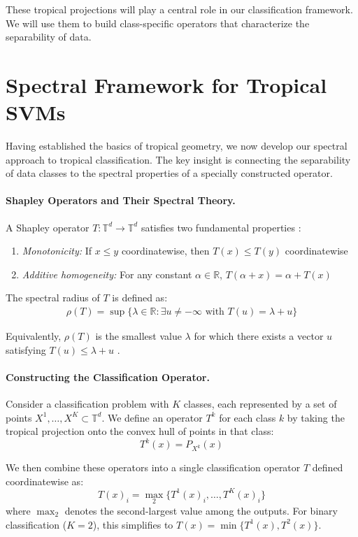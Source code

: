 \documentclass{article}
\newcommand{\R}{\mathbb{R}}
\newcommand{\trop}{\mathbb{T}}
\begin{document}
These tropical projections will play a central role in our classification framework. We will use them to build class-specific operators that characterize the separability of data.

\section{Spectral Framework for Tropical SVMs}\label{sec:spectral}

Having established the basics of tropical geometry, we now develop our spectral approach to tropical classification. The key insight is connecting the separability of data classes to the spectral properties of a specially constructed operator.

\paragraph{Shapley Operators and Their Spectral Theory.}
A Shapley operator $T: \trop^d \to \trop^d$ satisfies two fundamental properties \cite{kolokoltsov1992}:
\begin{enumerate}
    \item \textit{Monotonicity:} If $x \leq y$ coordinatewise, then $T(x) \leq T(y)$ coordinatewise
    \item \textit{Additive homogeneity:} For any constant $\alpha \in \R$, $T(\alpha + x) = \alpha + T(x)$
\end{enumerate}

The spectral radius of $T$ is defined as:
\begin{align}
\rho(T) = \sup\{\lambda \in \R : \exists u \neq -\infty \text{ with } T(u) = \lambda + u\}
\end{align}

Equivalently, $\rho(T)$ is the smallest value $\lambda$ for which there exists a vector $u$ satisfying $T(u) \leq \lambda + u$ \cite{nussbaum1986}.

\paragraph{Constructing the Classification Operator.}
Consider a classification problem with $K$ classes, each represented by a set of points $X^1,\dots,X^K \subset \trop^d$. We define an operator $T^k$ for each class $k$ by taking the tropical projection onto the convex hull of points in that class:
\[
T^k(x) = P_{X^k}(x)
\]

We then combine these operators into a single classification operator $T$ defined coordinatewise as:
\[
T(x)_i = \operatorname{\max}_2\{T^1(x)_i, \dots, T^K(x)_i\}
\]
where $\operatorname{\max}_2$ denotes the second-largest value among the outputs. For binary classification ($K=2$), this simplifies to $T(x)=\min\{T^1(x), T^2(x)\}$.
\end{document}

